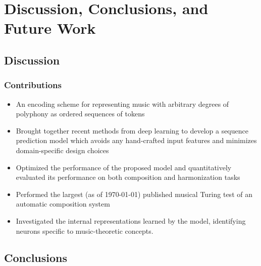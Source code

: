 \chapter{Discussion, Conclusions, and Future Work}


\ifpdf
    \graphicspath{{Chapter7/Figs/Raster/}{Chapter7/Figs/PDF/}{Chapter7/Figs/}}
\else
    \graphicspath{{Chapter7/Figs/Vector/}{Chapter7/Figs/}}
\fi

\section{Discussion}

\subsection{Contributions}

\begin{itemize}
    \item An encoding scheme for representing music with arbitrary degrees of polyphony
        as ordered sequences of tokens
    \item Brought together recent methods from deep learning to develop a
        sequence prediction model which avoids any hand-crafted input features
        and minimizes domain-specific design choices
    \item Optimized the performance of the proposed model and quantitatively
        evaluated its performance on both composition and harmonization tasks
    \item Performed the largest (as of \today) published musical Turing test of an
        automatic composition system
    \item Investigated the internal representations learned by the model, identifying
        neurons specific to music-theoretic concepts.
\end{itemize}

\section{Conclusions}

